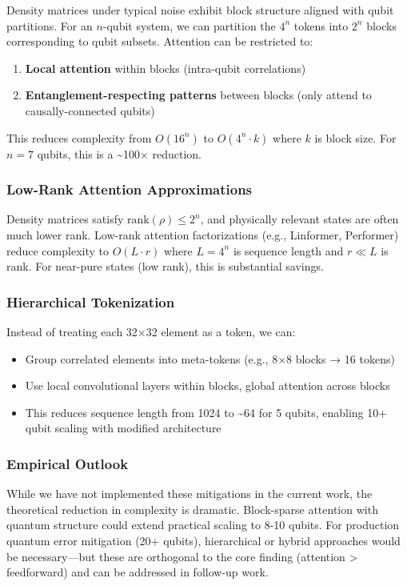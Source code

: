\documentclass[11pt]{article}
\begin{document}
Density matrices under typical noise exhibit block structure aligned with qubit partitions. For an \(n\)-qubit system, we can partition the \(4^n\) tokens into \(2^n\) blocks corresponding to qubit subsets. Attention can be restricted to:
\begin{enumerate}
\item \textbf{Local attention} within blocks (intra-qubit correlations)
\item \textbf{Entanglement-respecting patterns} between blocks (only attend to causally-connected qubits)
\end{enumerate}

This reduces complexity from \(O(16^n)\) to \(O(4^n \cdot k)\) where \(k\) is block size. For \(n=7\) qubits, this is a \textasciitilde{}100× reduction.
\subsubsection{Low-Rank Attention Approximations}
\label{sec:org62c207a}

Density matrices satisfy \(\text{rank}(\rho) \leq 2^n\), and physically relevant states are often much lower rank. Low-rank attention factorizations (e.g., Linformer, Performer) reduce complexity to \(O(L \cdot r)\) where \(L = 4^n\) is sequence length and \(r \ll L\) is rank. For near-pure states (low rank), this is substantial savings.
\subsubsection{Hierarchical Tokenization}
\label{sec:org6ea0660}

Instead of treating each 32×32 element as a token, we can:
\begin{itemize}
\item Group correlated elements into meta-tokens (e.g., 8×8 blocks → 16 tokens)
\item Use local convolutional layers within blocks, global attention across blocks
\item This reduces sequence length from 1024 to \textasciitilde{}64 for 5 qubits, enabling 10+ qubit scaling with modified architecture
\end{itemize}
\subsubsection{Empirical Outlook}
\label{sec:org5338f92}

While we have not implemented these mitigations in the current work, the theoretical reduction in complexity is dramatic. Block-sparse attention with quantum structure could extend practical scaling to 8-10 qubits. For production quantum error mitigation (20+ qubits), hierarchical or hybrid approaches would be necessary—but these are orthogonal to the core finding (attention > feedforward) and can be addressed in follow-up work.
\end{document}
